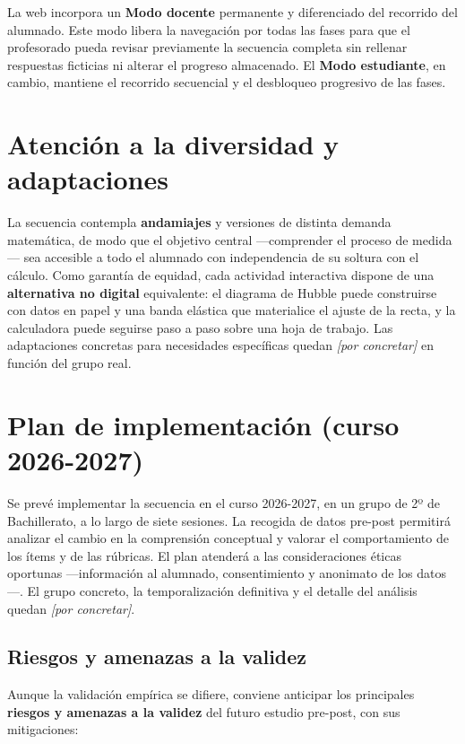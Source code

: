 La web incorpora un \textbf{Modo docente} permanente y diferenciado del recorrido del alumnado. Este modo libera la navegación por todas las fases para que el profesorado pueda revisar previamente la secuencia completa sin rellenar respuestas ficticias ni alterar el progreso almacenado. El \textbf{Modo estudiante}, en cambio, mantiene el recorrido secuencial y el desbloqueo progresivo de las fases.

\section{Atención a la diversidad y adaptaciones}\label{sec:diversidad}

La secuencia contempla \textbf{andamiajes} y versiones de distinta demanda matemática, de modo que el objetivo central ---comprender el proceso de medida--- sea accesible a todo el alumnado con independencia de su soltura con el cálculo. Como garantía de equidad, cada actividad interactiva dispone de una \textbf{alternativa no digital} equivalente: el diagrama de Hubble puede construirse con datos en papel y una banda elástica que materialice el ajuste de la recta, y la calculadora puede seguirse paso a paso sobre una hoja de trabajo. Las adaptaciones concretas para necesidades específicas quedan \textit{[por concretar]} en función del grupo real.

\section{Plan de implementación (curso 2026-2027)}\label{sec:implementacion}

Se prevé implementar la secuencia en el curso 2026-2027, en un grupo de 2º de Bachillerato, a lo largo de siete sesiones. La recogida de datos pre-post permitirá analizar el cambio en la comprensión conceptual y valorar el comportamiento de los ítems y de las rúbricas. El plan atenderá a las consideraciones éticas oportunas ---información al alumnado, consentimiento y anonimato de los datos---. El grupo concreto, la temporalización definitiva y el detalle del análisis quedan \textit{[por concretar]}.

\subsection{Riesgos y amenazas a la validez}\label{sec:riesgos}

Aunque la validación empírica se difiere, conviene anticipar los principales \textbf{riesgos y amenazas a la validez} del futuro estudio pre-post, con sus mitigaciones:

